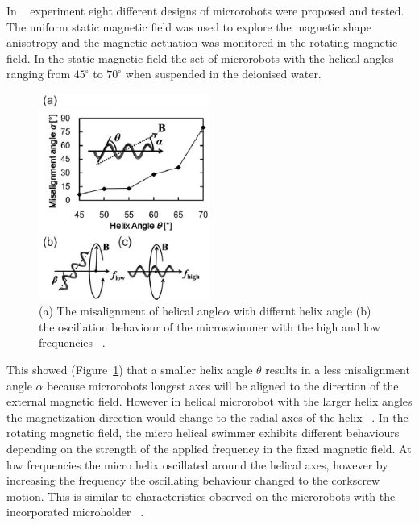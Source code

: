 \documentclass[a4paper,11pt]{article}
\begin{document}
\begin{sloppypar}
In ~\citeauthor{tottori2012magnetic} experiment eight different designs of microrobots were proposed and tested. 
The uniform static magnetic field was used to explore the magnetic shape anisotropy and the 
magnetic actuation was monitored in the rotating magnetic field. In the static magnetic field the 
set of microrobots with the helical angles ranging from ${45^{\circ}}$ to ${70^{\circ}}$ when suspended in the deionised water. 

\begin{figure}
  \begin{center}
    \includegraphics[width=0.5\textwidth]{7}
  \caption{(a) The misalignment of helical angle$\alpha$ with differnt helix angle (b) the oscillation behaviour
of the microswimmer with the high and low frequencies ~\citep{tottori2012magnetic}.}
  \label{ref7}
\end{center}
\end{figure}

This showed (Figure~\ref{ref7}) that a smaller helix angle $\theta$ results in a less misalignment 
angle $\alpha$ because microrobots longest axes will be aligned to the direction of the external magnetic field. 
However in helical microrobot with the larger helix angles the magnetization direction would change to 
the radial axes of the helix  ~\citep{tottori2012magnetic}.
In the rotating magnetic field, the micro helical swimmer exhibits different behaviours depending on 
the strength of the applied frequency in the fixed magnetic field. At low frequencies the micro helix oscillated 
around the helical axes, however by increasing the frequency the oscillating behaviour changed to the 
corkscrew motion. This is similar to characteristics observed on the microrobots with the incorporated
 microholder  ~\citep{tottori2012magnetic}. 


\end{sloppypar}
\end{document}

